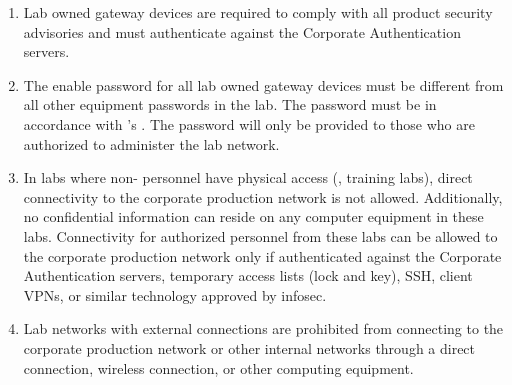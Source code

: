 \begin{enumerate}
\item
Lab owned gateway devices are required to comply with all \CompanyName{} product security advisories and must authenticate against the Corporate Authentication servers.
\item
The enable password for all lab owned gateway devices must be different from all other equipment passwords in the lab. 
The password must be in accordance with \CompanyName{}'s \PasswordPolicies{}.  
The password will only be provided to those who are authorized to administer the lab network.
\item
In labs where non-\CompanyName{} personnel have physical access (\eg, training labs), direct connectivity to the corporate production network is not allowed.  
Additionally, no \CompanyName{} confidential information can reside on any computer equipment in these labs.  
Connectivity for authorized personnel from these labs can be allowed to the corporate production network only if authenticated against the Corporate Authentication servers, temporary access lists (lock and key), SSH, client VPNs, or similar technology approved by \gls{infosec}.
\item
Lab networks with external connections are prohibited from connecting to the corporate production network or other internal networks through a direct connection, wireless connection, or other computing equipment.
\end{enumerate}
